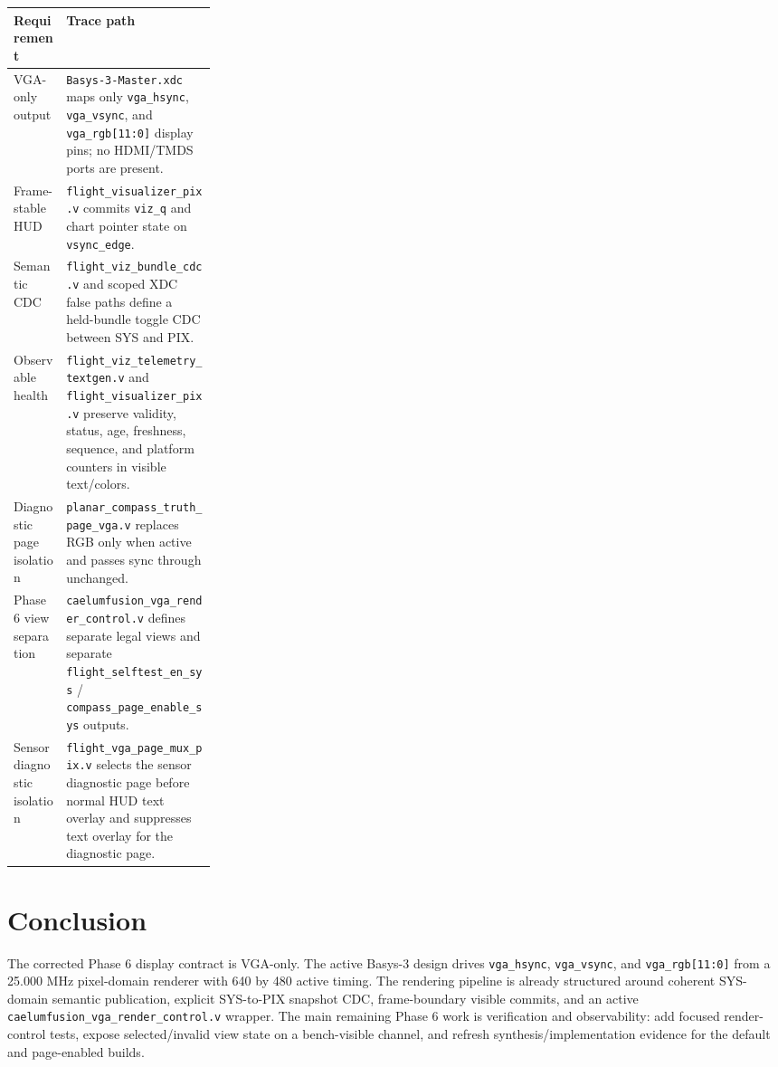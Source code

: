 \documentclass{article}
\newcommand{\sig}[1]{\begingroup\nolinkurl{#1}\endgroup}
\newcommand{\file}[1]{\begingroup\nolinkurl{#1}\endgroup}
\begin{document}
\begin{center}
\begin{tabularx}{\linewidth}{p{0.26\linewidth} X}
\toprule
\textbf{Requirement} & \textbf{Trace path} \\
\midrule
VGA-only output &
\file{Basys-3-Master.xdc} maps only \sig{vga_hsync}, \sig{vga_vsync}, and
\sig{vga_rgb[11:0]} display pins; no HDMI/TMDS ports are present. \\

Frame-stable HUD &
\file{flight_visualizer_pix.v} commits \sig{viz_q} and chart pointer state on
\sig{vsync_edge}. \\

Semantic CDC &
\file{flight_viz_bundle_cdc.v} and scoped XDC false paths define a held-bundle
toggle CDC between SYS and PIX. \\

Observable health &
\file{flight_viz_telemetry_textgen.v} and \file{flight_visualizer_pix.v}
preserve validity, status, age, freshness, sequence, and platform counters in
visible text/colors. \\

Diagnostic page isolation &
\file{planar_compass_truth_page_vga.v} replaces RGB only when active and passes
sync through unchanged. \\

Phase 6 view separation &
\file{caelumfusion_vga_render_control.v} defines separate legal views and
separate \sig{flight_selftest_en_sys} / \sig{compass_page_enable_sys} outputs. \\
Sensor diagnostic isolation &
\file{flight_vga_page_mux_pix.v} selects the sensor diagnostic page before
normal HUD text overlay and suppresses text overlay for the diagnostic page. \\
\bottomrule
\end{tabularx}
\end{center}

\section{Conclusion}

The corrected Phase 6 display contract is VGA-only.  The active Basys-3 design
drives \sig{vga_hsync}, \sig{vga_vsync}, and \sig{vga_rgb[11:0]} from a
25.000 MHz pixel-domain renderer with 640 by 480 active timing.  The rendering
pipeline is already structured around coherent SYS-domain semantic publication,
explicit SYS-to-PIX snapshot CDC, frame-boundary visible commits, and an active
\file{caelumfusion_vga_render_control.v} wrapper.  The main remaining Phase 6
work is verification and observability: add focused render-control tests,
expose selected/invalid view state on a bench-visible channel, and refresh
synthesis/implementation evidence for the default and page-enabled builds.
\end{document}
